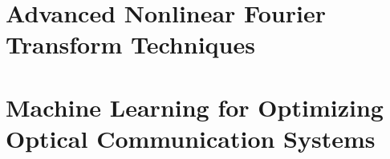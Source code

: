 %
%
%






\setlength{\parindent}{0pt}
\setlength{\parskip}{0pt} %
\frontmatter


\setcounter{page}{0}

% 


\cleardoublepage
{}
\tableofcontents

\cleardoublepage
{}
{} %
\listoffigures

\cleardoublepage
{}
{} %
\listoftables

\cleardoublepage
{}
{}


\setlength{\parskip}{1em}


\mainmatter

\cleardoublepage
\part{Advanced Nonlinear Fourier Transform Techniques}
% 




\cleardoublepage
\part{Machine Learning for Optimizing Optical Communication Systems}
% 
% 





